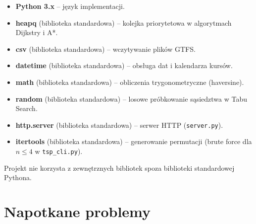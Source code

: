 \documentclass[12pt,a4paper]{article}
\begin{document}
\begin{itemize}
    \item \textbf{Python 3.x} -- język implementacji.
    \item \textbf{heapq} (biblioteka standardowa) -- kolejka priorytetowa w
          algorytmach Dijkstry i A*.
    \item \textbf{csv} (biblioteka standardowa) -- wczytywanie plików GTFS.
    \item \textbf{datetime} (biblioteka standardowa) -- obsługa dat i kalendarza kursów.
    \item \textbf{math} (biblioteka standardowa) -- obliczenia trygonometryczne
          (haversine).
    \item \textbf{random} (biblioteka standardowa) -- losowe próbkowanie sąsiedztwa
          w Tabu Search.
    \item \textbf{http.server} (biblioteka standardowa) -- serwer HTTP
          (\texttt{server.py}).
    \item \textbf{itertools} (biblioteka standardowa) -- generowanie permutacji
          (brute force dla $n \le 4$ w \texttt{tsp\_cli.py}).
\end{itemize}

Projekt nie korzysta z zewnętrznych bibliotek spoza biblioteki standardowej Pythona.

\section{Napotkane problemy}
\end{document}
